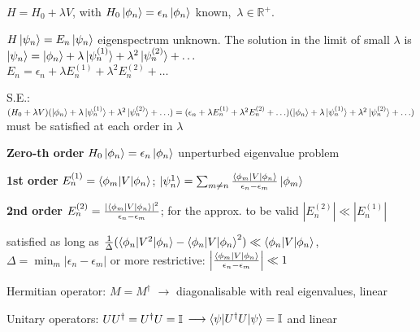\begin{squishlist}
    \item $H = H_0 + \lambda V$, with $H_0 \ket{\phi_n} = \epsilon_n \ket{\phi_n}$ known,\, $\lambda \in \mathbb{R}^+$. 
    \item $H \ket{\psi_n} = E_n \ket{\psi_n}$ eigenspectrum unknown. The solution in the limit of small $\lambda$ is 
    $\ket{\psi_n} = \ket{\phi_n} + \lambda \ket{\psi_n^{(1)}} + \lambda^2 \ket{\psi_n^{(2)}} + \ldots$ \\
    $E_n = \epsilon_n + \lambda E_n^{(1)} + \lambda^2 E_n^{(2)} + \ldots$
    \item S.E.: $(H_0 + \lambda V)(\ket{\phi_n} + \lambda \ket{\psi_n^{(1)}} + \lambda^2 \ket{\psi_n^{(2)}} + \ldots) = (\epsilon_n + \lambda E_n^{(1)} + \lambda^2 E_n^{(2)} + \ldots)(\ket{\phi_n} + \lambda \ket{\psi_n^{(1)}} + \lambda^2 \ket{\psi_n^{(2)}} + \ldots)$ must be satisfied at each order in $\lambda$
\end{squishlist}
\begin{squishlist}
    \item \textbf{Zero-th order} $H_0 \ket{\phi_n} = \epsilon_n \ket{\phi_n}$ unperturbed eigenvalue problem
    \item \textbf{1st order} $E_n^{(1)} = \braket{\phi_m|V|\phi_n}$; \quad $\ket{\psi_n^{1}} = \sum_{m\neq n}\frac{\braket{\phi_m |V |\phi_n}}{\epsilon_n - \epsilon_m} \ket{\phi_m}$
    \item \textbf{2nd order} $E_n^{(2)} = \frac{|\braket{\phi_m|V|\phi_n}|^2}{\epsilon_n - \epsilon_m}$; for the approx. to be valid  $|E_n^{(2)}| \ll |E_n^{(1)}|$ 
    \item satisfied as long as $\frac{1}{\Delta} ( \braket{\phi_n | V^2|\phi_n} - \braket{\phi_n | V| \phi_n}^2) \ll \braket{\phi_n | V | \phi_n}$, \\ 
    $\Delta = \min_m | \epsilon_n - \epsilon_m|$ or more restrictive: $\left|\frac{\braket{\phi_m | V | \phi_n}}{\epsilon_n - \epsilon_m}\right| \ll 1$
\end{squishlist}



\begin{squishlist}
    \item Hermitian operator: $M = M^{\dagger}$ $\longrightarrow$ diagonalisable with real eigenvalues, linear
    \item Unitary operators: $U U^{\dagger} = U^{\dagger}U = \mathbb{I}$ $\longrightarrow \braket{\psi | U^{\dagger}U|\psi} = \mathbb{I} $ and linear
\end{squishlist}

